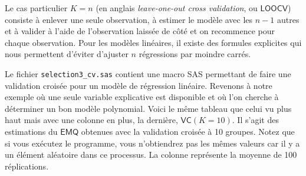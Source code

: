 \documentclass[
]{book}
\theoremstyle{definition}
\theoremstyle{definition}
\theoremstyle{definition}
\theoremstyle{remark}
\begin{document}
Le cas particulier \(K=n\) (en anglais \emph{leave-one-out cross validation}, ou \(\mathsf{LOOCV}\)) consiste à enlever une seule observation, à estimer le modèle avec les \(n-1\) autres et à valider à l'aide de l'observation laissée de côté et on recommence pour chaque observation. Pour les modèles linéaires, il existe des formules explicites qui nous permettent d'éviter d'ajuster \(n\) régressions par moindre carrés.

Le fichier \texttt{selection3\_cv.sas} contient une macro SAS permettant de faire une validation croisée pour un modèle de régression linéaire.
Revenons à notre exemple où une seule variable explicative est disponible et où l'on cherche à déterminer un bon modèle polynomial.
Voici le même tableau que celui vu plus haut mais avec une colonne en plus, la dernière, \(\mathsf{VC} (K=10)\). Il s'agit des estimations du \(\mathsf{EMQ}\) obtenues avec la validation croisée à 10 groupes. Notez que si vous exécutez le programme, vous n'obtiendrez pas les mêmes valeurs car il y a un élément aléatoire dans ce processus. La colonne représente la moyenne de 100 réplications.
\end{document}
